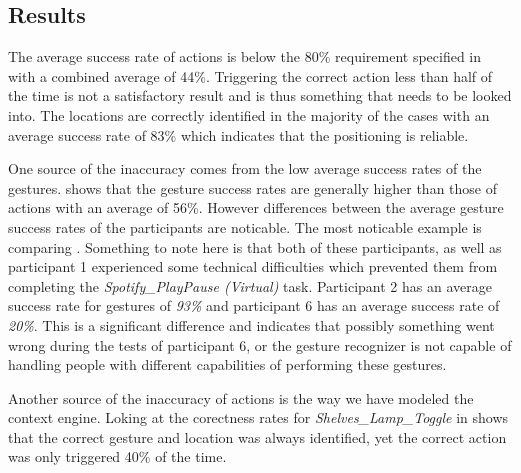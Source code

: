 \subsection{Results}
\label{sec:evaluation:user-tests-results}

The average success rate of actions is below the 80\% requirement specified in  with a combined average of 44\%.
Triggering the correct action less than half of the time is not a satisfactory result and is thus something that needs to be looked into.
The locations are correctly identified in the majority of the cases with an average success rate of 83\% which indicates that the positioning is reliable.

One source of the inaccuracy comes from the low average success rates of the gestures.
 shows that the gesture success rates are generally higher than those of actions with an average of 56\%.
However differences between the average gesture success rates of the participants are noticable.
The most noticable example is comparing .
Something to note here is that both of these participants, as well as participant 1 experienced some technical difficulties which prevented them from completing the \emph{Spotify\_PlayPause (Virtual)} task.
Participant 2 has an average success rate for gestures of \emph{93\%} and participant 6 has an average success rate of \emph{20\%}.
This is a significant difference and indicates that possibly something went wrong during the tests of participant 6, or the gesture recognizer is not capable of handling people with different capabilities of performing these gestures.

Another source of the inaccuracy of actions is the way we have modeled the context engine.
Loking at the corectness rates for \emph{Shelves_Lamp_Toggle} in  shows that the correct gesture and location was always identified, yet the correct action was only triggered 40\% of the time.

